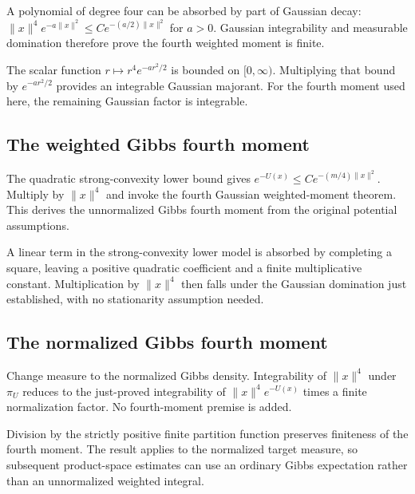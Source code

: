 \documentclass[11pt,a4paper]{report}
\begin{document}
A polynomial of degree four can be absorbed by part of Gaussian decay: \(\|x\|^4e^{-a\|x\|^2}\le C e^{-(a/2)\|x\|^2}\) for \(a>0\). Gaussian integrability and measurable domination therefore prove the fourth weighted moment is finite.



The scalar function \(r\mapsto r^4e^{-ar^2/2}\) is bounded on \([0,\infty)\). Multiplying that bound by \(e^{-ar^2/2}\) provides an integrable Gaussian majorant. For the fourth moment used here, the remaining Gaussian factor is integrable.

\subsection{\texorpdfstring{The weighted Gibbs fourth moment}{The weighted Gibbs fourth moment}}
\label{report-step-UnadjustedLangevin-MALAError-lean-16}


The quadratic strong-convexity lower bound gives \(e^{-U(x)}\le C e^{-(m/4)\|x\|^2}\). Multiply by \(\|x\|^4\) and invoke the fourth Gaussian weighted-moment theorem. This derives the unnormalized Gibbs fourth moment from the original potential assumptions.



A linear term in the strong-convexity lower model is absorbed by completing a square, leaving a positive quadratic coefficient and a finite multiplicative constant. Multiplication by \(\|x\|^4\) then falls under the Gaussian domination just established, with no stationarity assumption needed.

\subsection{\texorpdfstring{The normalized Gibbs fourth moment}{The normalized Gibbs fourth moment}}
\label{report-step-UnadjustedLangevin-MALAError-lean-17}


Change measure to the normalized Gibbs density. Integrability of \(\|x\|^4\) under \(\pi_U\) reduces to the just-proved integrability of \(\|x\|^4e^{-U(x)}\) times a finite normalization factor. No fourth-moment premise is added.



Division by the strictly positive finite partition function preserves finiteness of the fourth moment. The result applies to the normalized target measure, so subsequent product-space estimates can use an ordinary Gibbs expectation rather than an unnormalized weighted integral.
\end{document}
